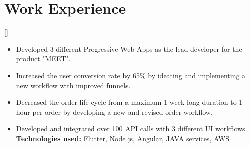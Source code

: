 \documentclass{article}
\begin{document}
\section{Work Experience}

[]
\begin{itemize}
    \item Developed 3 different Progressive Web Apps as the lead developer for the product "MEET".
    \item Increased the user conversion rate by 65\% by ideating and implementing a new workflow with improved funnels.
    \item Decreased the order life-cycle from a maximum 1 week long duration to 1 hour per order by developing a new and revised order workflow.
    \item Developed and integrated over 100 API calls with 3 different UI workflows.\\
\textbf{Technologies used:} Flutter, Node.js, Angular, JAVA services, AWS 

\end{itemize}



\end{document}
